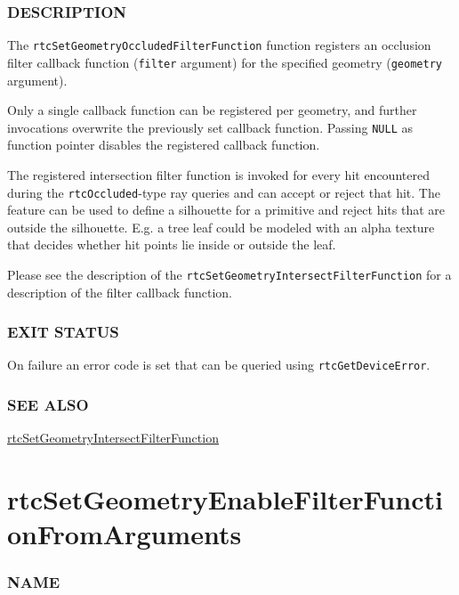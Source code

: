 \subsubsection{DESCRIPTION}\label{description}

The \texttt{rtcSetGeometryOccludedFilterFunction} function registers an
occlusion filter callback function (\texttt{filter} argument) for the
specified geometry (\texttt{geometry} argument).

Only a single callback function can be registered per geometry, and
further invocations overwrite the previously set callback function.
Passing \texttt{NULL} as function pointer disables the registered
callback function.

The registered intersection filter function is invoked for every hit
encountered during the \texttt{rtcOccluded}-type ray queries and can
accept or reject that hit. The feature can be used to define a
silhouette for a primitive and reject hits that are outside the
silhouette. E.g. a tree leaf could be modeled with an alpha texture that
decides whether hit points lie inside or outside the leaf.

Please see the description of the
\texttt{rtcSetGeometryIntersectFilterFunction} for a description of the
filter callback function.

\subsubsection{EXIT STATUS}\label{exit-status}

On failure an error code is set that can be queried using
\texttt{rtcGetDeviceError}.

\subsubsection{SEE ALSO}\label{see-also}

\hyperref[rtcsetgeometryintersectfilterfunction]{rtcSetGeometryIntersectFilterFunction}

\pagebreak

\section{rtcSetGeometryEnableFilterFunctionFromArguments}\label{rtcsetgeometryenablefilterfunctionfromarguments}

\subsubsection{NAME}\label{name}

